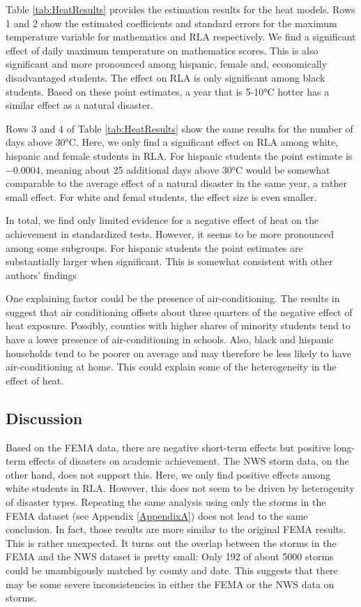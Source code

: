 Table \ref{tab:HeatResults} provides the estimation results for the heat models. Rows 1 and 2 show the estimated coefficients and standard errors for the maximum temperature variable for mathematics and RLA respectively. We find a significant effect of daily maximum temperature on mathematics scores. This is also significant and more pronounced among hispanic, female and, economically disadvantaged students. The effect on RLA is only significant among black students. Based on these point estimates, a year that is 5-10°C hotter has a similar effect as a natural disaster.



Rows 3 and 4 of Table \ref{tab:HeatResults} show the same results for the number of days above 30°C. Here, we only find a significant effect on RLA among white, hispanic and female students in RLA. For hispanic students the point estimate is $-0.0004$, meaning about 25 additional days above 30°C would be somewhat comparable to the average effect of a natural disaster in the same year, a rather small effect. For white and femal students, the effect size is even smaller.

In total, we find only limited evidence for a negative effect of heat on the achievement in standardized tests. However, it seems to be more pronounced among some subgroups. For hispanic students the point estimates are substantially larger when significant. This is somewhat consistent with other authors' findings \citep[for example][]{Goodman_2020}

One explaining factor could be the presence of air-conditioning. The results in \cite{Goodman_2020} suggest that air conditioning offsets about three quarters of the negative effect of heat exposure. Possibly, counties with higher shares of minority students tend to have a lower presence of air-conditioning in schools. Also, black and hispanic households tend to be poorer on average and may therefore be less likely to have air-conditioning at home. This could explain some of the heterogeneity in the effect of heat.

\subsection{Discussion}

Based on the FEMA data, there are negative short-term effects but positive long-term effects of disasters on academic achievement. The NWS storm data, on the other hand, does not support this. Here, we only find positive effects among white students in RLA. However, this does not seem to be driven by heterogenity of disaster types. Repeating the same analysis using only the storms in the FEMA dataset (see Appendix \ref{AppendixA}) does not lead to the same conclusion. In fact, those results are more similar to the original FEMA results. This is rather unexpected. It turns out the overlap between the storms in the FEMA and the NWS dataset is pretty small: Only 192 of about 5000 storms could be unambigously matched by county and date. This suggests that there may be some severe inconsistencies in either the FEMA or the NWS data on storms.

